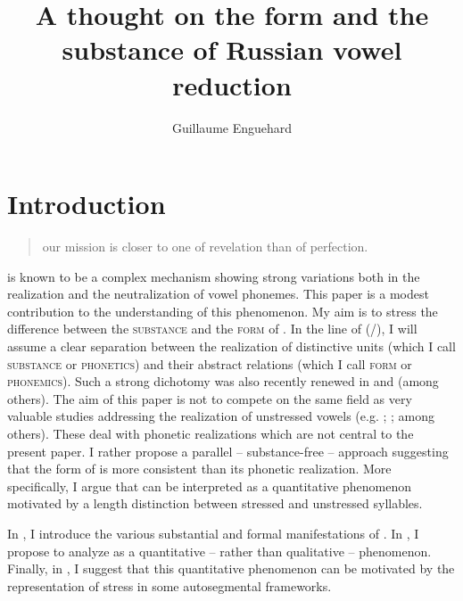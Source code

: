 \documentclass[output=paper,modfonts,newtxmath,hidelinks,]{langscibook}
\title{A thought on the form and the substance of Russian vowel reduction}
\author{Guillaume Enguehard\affiliation{Université d’Orléans, CNRS/LLL}}
\begin{document}
\maketitle
{}

\section{Introduction}

\begin{quotation}
\begin{raggedleft}
[\dots] our mission is closer to one of revelation than of perfection.\\\hfill\citep[132]{Hamilton1980}
\end{raggedleft}
\end{quotation}





    is known to be a complex mechanism showing strong variations both in the realization and the neutralization of vowel phonemes. This paper is a modest contribution to the understanding of this phenomenon. My aim is to stress the difference between the \textsc{substance} and the \textsc{form} of  . In the line of \citeauthor{Hjelmslev1943} (\citeyear{Hjelmslev1943}/\citeyear{Hjelmslev1971}), I will assume a clear separation between the realization of distinctive units (which I call \textsc{substance} or \textsc{phonetics}) and their abstract relations (which I call \textsc{form} or \textsc{phonemics}). Such a strong dichotomy was also recently renewed in \citet{Hale-Reiss2000} and \citet{Dresher2008} (among others). The aim of this paper is not to compete on the same field as very valuable studies addressing the realization of  unstressed vowels (e.g. \citealt{Crosswhite2000a,Crosswhite2000b}; \citealt{Padgett2004}; among others). These deal with phonetic realizations which are not central to the present paper. I rather propose a parallel -- substance-free -- approach suggesting that the form of   is more consistent than its phonetic realization. More specifically, I argue that   can be interpreted as a quantitative phenomenon motivated by a length distinction between stressed and unstressed syllables.

In , I introduce the various substantial and formal manifestations of  . In , I propose to analyze   as a quantitative -- rather than qualitative -- phenomenon. Finally, in , I suggest that this quantitative phenomenon can be motivated by the representation of stress in some autosegmental frameworks.
\end{document}

